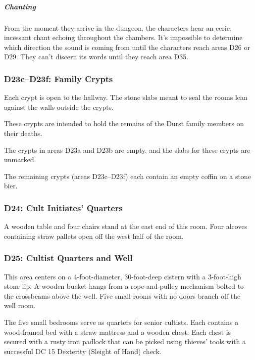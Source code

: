 \documentclass[10pt,a4paper,twoside,bg=print,twocolumn,openany,nodeprecatedcode]{dndbook}
\begin{document}
\subparagraph{Chanting}
From the moment they arrive in the dungeon, the characters hear an eerie, incessant chant echoing throughout the chambers. It's impossible to determine which direction the sound is coming from until the characters reach areas D26 or D29. They can't discern its words until they reach area D35.

\subsubsection{D23c–D23f: Family Crypts}
\begin{DndReadAloud}{}
Each crypt is open to the hallway. The stone slabs meant to seal the rooms lean against the walls outside the crypts.

\end{DndReadAloud}

These crypts are intended to hold the remains of the Durst family members on their deaths.

The crypts in areas D23a and D23b are empty, and the slabs for these crypts are unmarked.

The remaining crypts (areas D23c–D23f) each contain an empty coffin on a stone bier.

\subsubsection{D24: Cult Initiates' Quarters}
A wooden table and four chairs stand at the east end of this room. Four alcoves containing straw pallets open off the west half of the room.

\subsubsection{D25: Cultist Quarters and Well}
\begin{DndReadAloud}{}
This area centers on a 4-foot-diameter, 30-foot-deep cistern with a 3-foot-high stone lip. A wooden bucket hangs from a rope-and-pulley mechanism bolted to the crossbeams above the well. Five small rooms with no doors branch off the well room.

\end{DndReadAloud}

The five small bedrooms serve as quarters for senior cultists. Each contains a wood-framed bed with a straw mattress and a wooden chest. Each chest is secured with a rusty iron padlock that can be picked using thieves' tools with a successful DC 15 Dexterity (Sleight of Hand) check.
\end{document}
